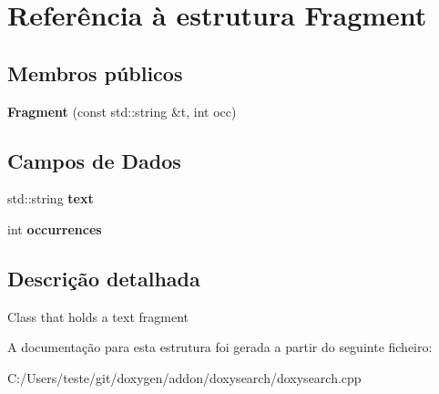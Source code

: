 \hypertarget{struct_fragment}{\section{Referência à estrutura Fragment}
\label{struct_fragment}
}
\subsection*{Membros públicos}
\begin{DoxyCompactItemize}
\item 
\hypertarget{struct_fragment_ac9df7359999f76bd6b28c8568bcb76ea}{{\bfseries Fragment} (const std\-::string \&t, int occ)}\label{struct_fragment_ac9df7359999f76bd6b28c8568bcb76ea}

\end{DoxyCompactItemize}
\subsection*{Campos de Dados}
\begin{DoxyCompactItemize}
\item 
\hypertarget{struct_fragment_a23c058547fbc73b5659191844a9f258c}{std\-::string {\bfseries text}}\label{struct_fragment_a23c058547fbc73b5659191844a9f258c}

\item 
\hypertarget{struct_fragment_a326d0f330d407b41a99ba6cefd67fd2c}{int {\bfseries occurrences}}\label{struct_fragment_a326d0f330d407b41a99ba6cefd67fd2c}

\end{DoxyCompactItemize}


\subsection{Descrição detalhada}
Class that holds a text fragment 

A documentação para esta estrutura foi gerada a partir do seguinte ficheiro\-:\begin{DoxyCompactItemize}
\item 
C\-:/\-Users/teste/git/doxygen/addon/doxysearch/doxysearch.\-cpp\end{DoxyCompactItemize}
